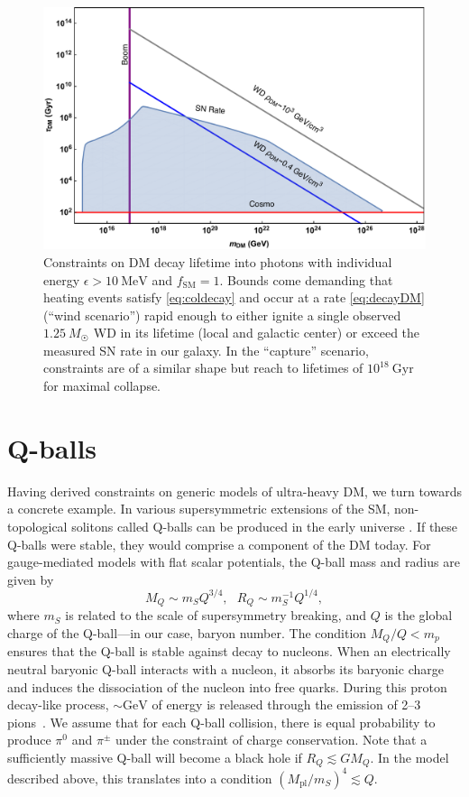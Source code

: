 \documentclass[twocolumn, preprintnumbers,amsmath,amssymb,prd, superscriptaddress]{revtex4}
\begin{document}
\begin{figure}
\includegraphics[scale=.3]{decayobservation.pdf}
\caption{Constraints on DM decay lifetime into photons with individual energy $\epsilon > 10~\text{MeV}$ and $f_\text{SM} = 1$. Bounds come demanding that heating events satisfy \eqref{eq:coldecay} and occur at a rate \eqref{eq:decayDM} (``wind scenario'') rapid enough to either ignite a single observed $1.25~M_{\astrosun}$ WD in its lifetime (local and galactic center) or exceed the measured SN rate in our galaxy. In the ``capture'' scenario, constraints are of a similar shape but reach to lifetimes of $10^{18}~\text{Gyr}$ for maximal collapse.}
\label{fig:decayclasses}
\end{figure}

\section{Q-balls}
\label{sec:QBalls}

Having derived constraints on generic models of ultra-heavy DM, we turn towards a concrete example.
In various supersymmetric extensions of the SM, non-topological solitons called Q-balls can be produced in the early universe \cite{Coleman:1985ki, Kusenko:1997si}.
If these Q-balls were stable, they would comprise a component of the DM today.
For gauge-mediated models with flat scalar potentials, the Q-ball mass and radius are given by
\begin{equation}
\label{eq:Qballprop}
M_Q \sim m_S Q^{3/4}, ~~~ R_Q \sim m_S^{-1} Q^{1/4},
\end{equation}
where $m_S$ is related to the scale of supersymmetry breaking, and $Q$ is the global charge of the Q-ball---in our case, baryon number.
The condition $M_Q/Q < m_p$ ensures that the Q-ball is stable against decay to nucleons.
When an electrically neutral baryonic Q-ball interacts with a nucleon, it absorbs its baryonic charge and induces the dissociation of the nucleon into free quarks.
During this proton decay-like process, $\sim \text{GeV}$ of energy is released through the emission of 2--3 pions~\cite{Kusenko:1998}.
We assume that for each Q-ball collision, there is equal probability to produce $\pi^0$ and $\pi^\pm$ under the constraint of charge conservation.
Note that a sufficiently massive Q-ball will become a black hole if $R_Q \lesssim G M_Q$.
In the model described above, this translates into a condition $(M_\text{pl}/m_S)^4 \lesssim Q$.
\end{document}
